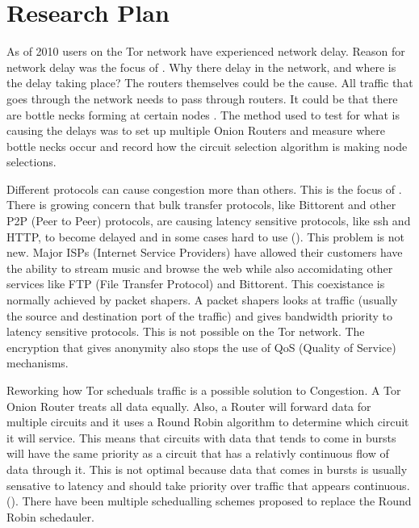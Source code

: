 \documentclass[letterpaper,12pt]{texMemo}
\begin{document}
\section*{Research Plan}
    As of 2010 users on the Tor network have experienced network delay. Reason for network delay was the
    focus of \citeauthor[]{delay}.  Why there delay in the network, and
    where is the delay taking place? The routers themselves could be the cause. All traffic that
    goes through the network needs to pass through routers. It could be that there are bottle
    necks forming at certain nodes \citeauthor{delay}. The method used to test for what is causing the delays was
    to set up multiple Onion Routers and measure where bottle necks occur and record how the circuit
    selection algorithm is making node selections.

    Different protocols can cause congestion more than others. This is the focus of
    \citeauthor{analysis}.  There is growing concern that bulk transfer protocols, like Bittorent
    and other P2P (Peer to Peer) protocols, are causing latency sensitive protocols, like ssh and
    HTTP, to become delayed and in some cases hard to use (\citeauthor[2]{analysis}). This problem
    is not new.  Major ISPs (Internet Service Providers) have allowed 
    their customers have the ability to stream music and browse the web while also accomidating other
    services like FTP (File Transfer Protocol) and Bittorent. This coexistance is normally achieved
    by packet shapers. A packet shapers looks at traffic (usually the source and destination port of
    the traffic) and gives bandwidth priority to latency sensitive protocols. This is not possible on
    the Tor network. The encryption that gives anonymity also stops the use of QoS (Quality of
    Service) mechanisms.

    Reworking how Tor scheduals traffic is a possible solution to Congestion.  A Tor Onion Router
    treats all data equally. Also, a Router will forward data for multiple circuits and it uses a Round Robin
    algorithm to determine which circuit it will service. This means that circuits with data that
    tends to come in bursts will have the same priority as a circuit that has a relativly continuous
    flow of data through it. This is not optimal because data that comes in bursts is usually
    sensative to latency and should take priority over traffic that appears continuous.
    (\citeauthor[2]{unfair}).  There have been multiple schedualling schemes proposed to replace the
    Round Robin schedauler.
\end{document}
